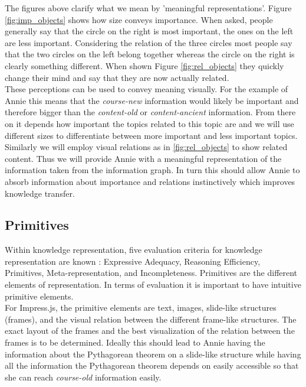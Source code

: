 \documentclass[twoside]{article}
\begin{document}
The figures above clarify what we mean by 'meaningful representations'. Figure \ref{fig:imp_objects} shows how size conveys importance. When asked, people generally say that the circle on the right is most important, the ones on the left are less important. Considering the relation of the three circles most people say that the two circles on the left belong together whereas the circle on the right is clearly something different. When shown Figure \ref{fig:rel_objects} they quickly change their mind and say that they are now actually related.\\

These perceptions can be used to convey meaning visually. For the example of Annie this means that the \textit{course-new} information would likely be important and therefore bigger than the \textit{content-old} or \textit{content-ancient} information. From there on it depends how important the topics related to this topic are and we will use different sizes to differentiate between more important and less important topics. Similarly we will employ visual relations as in \ref{fig:rel_objects} to show related content. Thus we will provide Annie with a meaningful representation of the information taken from the information graph. In turn this should allow Annie to absorb information about importance and relations instinctively which improves knowledge transfer.\\



\subsection{Primitives}
\label{sec:primitives}

Within knowledge representation, five evaluation criteria for knowledge representation are known \cite{Kohlhase:Complog:base}: Expressive Adequacy, Reasoning Efficiency, Primitives, Meta-representation, and Incompleteness. Primitives are the different elements of representation. In terms of evaluation it is important to have intuitive primitive elements. \\

For Impress.js, the primitive elements are text, images, slide-like structures (frames), and the visual relation between the different frame-like structures. The exact layout of the frames and the best visualization of the relation between the frames is to be determined. Ideally this should lead to Annie having the information about the Pythagorean theorem on a slide-like structure while having all the information the Pythagorean theorem depends on easily accessible so that she can reach \textit{course-old} information easily.  
\end{document}

